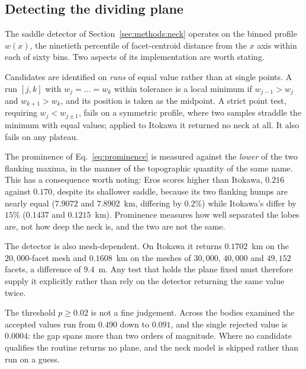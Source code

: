 \subsection{Detecting the dividing plane}
\label{app:clip:neck}

The saddle detector of Section~\ref{sec:methods:neck} operates on the binned
profile $w(x)$, the ninetieth percentile of facet-centroid distance from the
$x$ axis within each of sixty bins. Two aspects of its implementation are worth
stating.

Candidates are identified on \emph{runs} of equal value rather than at single
points. A run $[j,k]$ with $w_j = \dots = w_k$ within tolerance is a local
minimum if $w_{j-1} > w_j$ and $w_{k+1} > w_k$, and its position is taken as
the midpoint. A strict point test, requiring $w_j < w_{j\pm1}$, fails on a
symmetric profile, where two samples straddle the minimum with equal values;
applied to Itokawa it returned no neck at all. It also fails on any plateau.

The prominence of Eq.~\eqref{eq:prominence} is measured against the
\emph{lower} of the two flanking maxima, in the manner of the topographic
quantity of the same name. This has a consequence worth noting: Eros scores
higher than Itokawa, $0.216$ against $0.170$, despite its shallower saddle,
because its two flanking humps are nearly equal ($7.9072$ and $7.8902$~km,
differing by $0.2\%$) while Itokawa's differ by $15\%$ ($0.1437$ and
$0.1215$~km). Prominence measures how well separated the lobes are, not how
deep the neck is, and the two are not the same.

The detector is also mesh-dependent. On Itokawa it returns $0.1702$~km on the
$20{,}000$-facet mesh and $0.1608$~km on the meshes of $30{,}000$, $40{,}000$
and $49{,}152$ facets, a difference of $9.4$~m. Any test that holds the
plane fixed must therefore supply it explicitly rather than rely on the
detector returning the same value twice.

The threshold $p \ge 0.02$ is not a fine judgement. Across the bodies examined
the accepted values run from $0.490$ down to $0.091$, and the single rejected
value is $0.0004$: the gap spans more than two orders of magnitude. Where no
candidate qualifies the routine returns no plane, and the neck model is skipped
rather than run on a guess.


